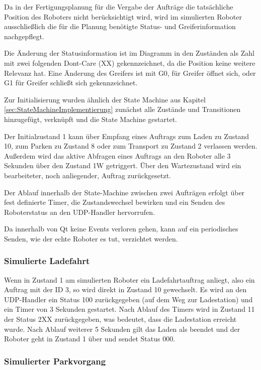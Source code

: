 Da in der Fertigungsplanung für die Vergabe der Aufträge die tatsächliche Position des Roboters nicht berücksichtigt wird, wird im simulierten Roboter ausschließlich die für die Planung benötigte Status- und Greiferinformation nachgepflegt. 

Die Änderung der Statusinformation ist im Diagramm in den Zuständen als Zahl mit zwei folgenden Dont-Care (XX) gekennzeichnet, da die Position keine weitere Relevanz hat. Eine Änderung des Greifers ist mit G0, für Greifer öffnet sich, oder G1 für Greifer schließt sich gekennzeichnet.

Zur Initialisierung wurden ähnlich der State Machine aus Kapitel \ref{sec:StateMachineImplementierung} zunächst alle Zustände und Transitionen hinzugefügt, verknüpft und die State Machine gestartet. 

Der Initialzustand 1 kann über Empfang eines Auftrags zum Laden zu Zustand 10, zum Parken zu Zustand 8 oder zum Transport zu Zustand 2 verlassen werden. Außerdem wird das aktive Abfragen eines Auftrags an den Roboter alle 3 Sekunden über den Zustand 1W getriggert. Über den Wartezustand wird ein bearbeiteter, noch anliegender, Auftrag zurückgesetzt. 

Der Ablauf innerhalb der State-Machine zwischen zwei Aufträgen erfolgt über fest definierte Timer, die Zustandswechsel bewirken und ein Senden des Roboterstatus an den UDP-Handler hervorrufen.

Da innerhalb von Qt keine Events verloren gehen, kann auf ein periodisches Senden, wie der echte Roboter es tut, verzichtet werden.

\subsubsection{Simulierte Ladefahrt}

Wenn in Zustand 1 am simulierten Roboter ein Ladefahrtauftrag anliegt, also ein Auftrag mit der ID 3, so wird direkt in Zustand 10 gewechselt. Es wird an den UDP-Handler ein Status 100 zurückgegeben (auf dem Weg zur Ladestation) und ein Timer von 3 Sekunden gestartet. Nach Ablauf des Timers wird in Zustand 11 der Status 2XX zurückgegeben, was bedeutet, dass die Ladestation erreicht wurde. Nach Ablauf weiterer 5 Sekunden gilt das Laden als beendet und der Roboter geht in Zustand 1 über und sendet Status 000.

\subsubsection{Simulierter Parkvorgang}

